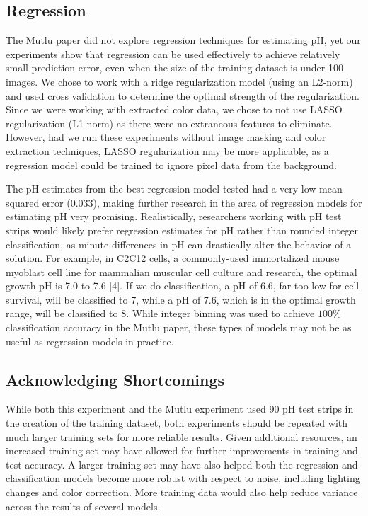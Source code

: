 \documentclass[journal]{IEEEtran}
\begin{document}
\subsection{Regression}
The Mutlu paper did not explore regression techniques for estimating pH, yet our experiments show that regression can be used effectively to achieve relatively small prediction error, even when the size of the training dataset is under 100 images. We chose to work with a ridge regularization model (using an L2-norm) and used cross validation to determine the optimal strength of the regularization. Since we were working with extracted color data, we chose to not use LASSO regularization (L1-norm) as there were no extraneous features to eliminate. However, had we run these experiments without image masking and color extraction techniques, LASSO regularization may be more applicable, as a regression model could be trained to ignore pixel data from the background.

The pH estimates from the best regression model tested had a very low mean squared error ($0.033$), making further research in the area of regression models for estimating pH very promising. Realistically, researchers working with pH test strips would likely prefer regression estimates for pH rather than rounded integer classification, as minute differences in pH can drastically alter the behavior of a solution. For example, in C2C12 cells, a commonly-used immortalized mouse myoblast cell line for mammalian muscular cell culture and research, the optimal growth pH is 7.0 to 7.6 [4]. If we do classification, a pH of 6.6, far too low for cell survival, will be classified to 7, while a pH of 7.6, which is in the optimal growth range, will be classified to 8. While integer binning was used to achieve $100\%$ classification accuracy in the Mutlu paper, these types of models may not be as useful as regression models in practice. 

\subsection{Acknowledging Shortcomings}
While both this experiment and the Mutlu experiment used 90 pH test strips in the creation of the training dataset, both experiments should be repeated with much larger training sets for more reliable results. Given additional resources, an increased training set may have allowed for further improvements in training and test accuracy. A larger training set may have also helped both the regression and classification models become more robust with respect to noise, including lighting changes and color correction. More training data would also help reduce variance across the results of several models. 
\end{document}
